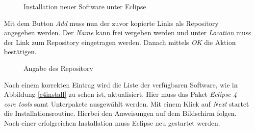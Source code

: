 \begin{figure}[H]
  \vspace{0.5cm}
  \centering
  \caption{Installation neuer Software unter Eclipse}
  \label{installnew}
  \vspace{0.5cm}
\end{figure}

Mit dem Button \textit{Add} muss nun der zuvor kopierte Links als Repository angegeben werden. Der \textit{Name} kann frei vergeben werden und unter \textit{Location} muss der Link zum Repository eingetragen werden. Danach mittels \textit{OK} die Aktion bestätigen.

\begin{figure}[H]
  \vspace{0.5cm}
  \centering
  \caption{Angabe des Repository}
  \label{insertrepo}
  \vspace{0.5cm}
\end{figure}

Nach einem korrekten Eintrag wird die Liste der verfügbaren Software, wie in Abbildung \ref{e4install} zu sehen ist, aktualisiert. Hier muss das Paket \textit{Eclipse 4 core tools} samt Unterpakete ausgewählt werden. Mit einem Klick auf \textit{Next} startet die Installationsroutine. Hierbei den Anweisungen auf dem Bildschirm folgen. Nach einer erfolgreichen Installation muss Eclipse neu gestartet werden.

